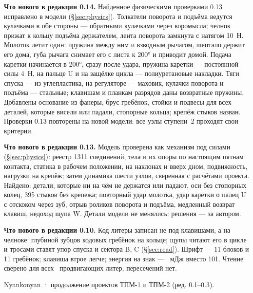 \begin{titlepage}
\begin{minipage}{0.86\textwidth}
\textbf{Что нового в редакции 0.14.} Найденное физическими проверками 0.13 исправлено в модели (\S\ref{sec:physics}). Толкатели поворота и подъёма ведутся кулачками в обе стороны — обратными кулачками через коромысла; челнок прижат к кольцу подъёма держателем, лента поворота замкнута с натягом 10~Н. Молоток летит один: пружина между ним и взводным рычагом, шептало держит его дома, губа рычага снимает его с листа к 200° и приводит домой. Подача каретки начинается в 200°, сразу после удара, пружина каретки — постоянной силы 4~Н, на пальце U и на защёлке цикла — полиуретановые накладки. Тяги спуска — из углепластика, на регуляторе — маховик, кулачки поворота и подъёма — стальные; клавишам и планкам разрядов даны возвратные пружины. Добавлены основание из фанеры, брус гребёнок, стойки и подвесы для всех деталей, которые висели или падали, стопорные кольца; крепёж стыков назван. Проверки 0.13 повторены на новой модели: все узлы ступени~2 проходят свои критерии.

\textbf{Что нового в редакции 0.13.} Модель проверена как механизм под силами (\S\ref{sec:physics}): реестр 1311 соединений, тела и их опоры по настоящим пятнам контакта, статика в рабочем положении, на наклонах и вверх дном, подвижность, нагрузки на крепёж; затем динамика шести узлов, сверенная с расчётами проекта. Найдено: детали, которые ни на чём не держатся или падают, оси без стопорных колец, 395 стыков без крепежа; повторный удар молотка, удар каретки о палец U с отскоком через зуб, отрыв роликов поворота и подъёма, медленный возврат клавиш, недоход щупа W. Детали модели не менялись: решения — за автором.

\textbf{Что нового в редакции 0.10.} Код литеры записан не под клавишами, а на челноке: глубиной зубцов кодовых гребёнок на кольце; щупы читают его в цикле и тросами ставят упор спуска и сектора B, C (\S\ref{sec:read}). Шрифт — 11 блоков и 11 гребёнок; клавиша втрое легче; энергия на знак — \mEchar~мДж вместо 101. Чтение сверено для всех \rdn\ продвигающих литер, пересечений нет.

\end{minipage}
\vfill
{\small Nyankonyan · продолжение проектов ТПМ-1 и ТПМ-2 (ред. 0.1–0.3).}
\end{titlepage}

